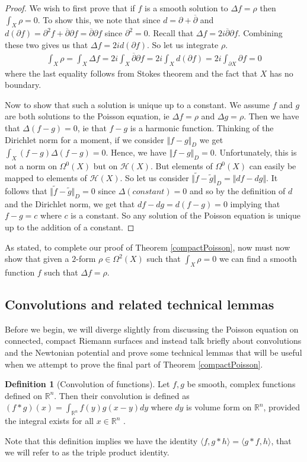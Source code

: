\documentclass[11pt]{report}
\theoremstyle{definition}
\newtheorem{defn}[thm]{Definition}
\begin{document}
\begin{proof}
  We wish to first prove that if $f$ is a smooth solution to $\Delta f = \rho$ then $\int_X \rho = 0$. To show this, we note that since $d = \partial + \overline{\partial}$ and $d(\partial f) = \partial^2 f + \overline{\partial}\partial f = \overline{\partial}\partial f$ since $\partial^2 = 0$. Recall that  $\Delta f = 2i \overline{\partial}\partial f$. Combining these two gives us that $\Delta f =2id(\partial f)$. So let us integrate $\rho$.
  \begin{align*}
    \int_X \rho = \int_X \Delta f = 2i \int_X \overline{\partial}\partial f = 2i \int_X d(\partial f) = 2i\int_{\partial X}\partial f = 0
  \end{align*}
  where the last equality follows from Stokes theorem and the fact that $X$ has no boundary. 

  Now to show that such a solution is unique up to a constant. We assume $f$ and $g$ are both solutions to the Poisson equation, ie $\Delta f = \rho$ and $\Delta g = \rho$. Then we have that $\Delta (f - g) = 0$, ie that $f-g$ is a harmonic function. Thinking of the Dirichlet norm for a moment, if we consider $\Vert f-g\Vert _D$ we get $\int_X (f-g)\Delta(f-g) = 0$. Hence, we have $\Vert f-g\Vert _D = 0$. Unfortunately, this is not a norm on $\Omega^0(X)$ but on $\mathcal{H}(X)$. But elements of $\Omega^0(X)$ can easily be mapped to elements of $\mathcal{H}(X)$. So let us consider $\Vert \tilde{f}-\tilde{g}\Vert _D = \Vert df - dg\Vert $. It follows that $\Vert \tilde{f}-\tilde{g}\Vert _D = 0$ since $\Delta(constant) = 0$ and so by the definition of $d$ and the Dirichlet norm, we get that $ df - dg = d(f-g) = 0$ implying that $f - g = c$ where $c$ is a constant. So any solution of the Poisson equation is unique up to the addition of a constant.
\end{proof} 

As stated, to complete our proof of Theorem \ref{compactPoisson}, now must now show that given a $2$-form $\rho \in \Omega^2(X)$ such that $\int_X \rho = 0$ we can find a smooth function $f$ such that $\Delta f = \rho$. 

\subsection{Convolutions and related technical lemmas}
Before we begin, we will diverge slightly from discussing the Poisson equation on connected, compact Riemann surfaces and instead talk briefly about convolutions and the Newtonian potential and prove some technical lemmas that will be useful when we attempt to prove the final part of Theorem \ref{compactPoisson}.
\begin{defn}[Convolution of functions]\label{ConvolutionDefn}
  Let $f,g$ be smooth, complex functions defined on $\mathbb{R}^n$. Then their convolution is defined as $(f * g)(x) = \int_{\mathbb{R}^n}f(y)g(x-y)dy$ where $dy$ is volume form on $\mathbb{R}^n$, provided the integral exists for all $x \in \mathbb{R}^n$ .
\end{defn}
Note that this definition implies we have the identity $\langle f, g*h \rangle = \langle g*f, h \rangle$, that we will refer to as the triple product identity.
\end{document}
